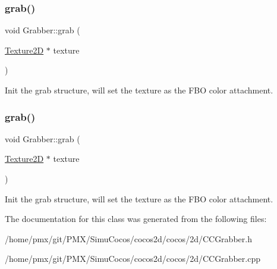 \subsubsection{\texorpdfstring{grab()}{grab()}\hspace{0.1cm}{\footnotesize\ttfamily [1/2]}}
{\footnotesize\ttfamily void Grabber\+::grab (\begin{DoxyParamCaption}\item[{\hyperlink{classTexture2D}{Texture2D} $\ast$}]{texture }\end{DoxyParamCaption})}

Init the grab structure, will set the texture as the F\+BO color attachment. \mbox{\label{classGrabber_abca4258ce3080009f5ed06d30ea913f7}} 
\subsubsection{\texorpdfstring{grab()}{grab()}\hspace{0.1cm}{\footnotesize\ttfamily [2/2]}}
{\footnotesize\ttfamily void Grabber\+::grab (\begin{DoxyParamCaption}\item[{\hyperlink{classTexture2D}{Texture2D} $\ast$}]{texture }\end{DoxyParamCaption})}

Init the grab structure, will set the texture as the F\+BO color attachment. 

The documentation for this class was generated from the following files\+:\begin{DoxyCompactItemize}
\item 
/home/pmx/git/\+P\+M\+X/\+Simu\+Cocos/cocos2d/cocos/2d/C\+C\+Grabber.\+h\item 
/home/pmx/git/\+P\+M\+X/\+Simu\+Cocos/cocos2d/cocos/2d/C\+C\+Grabber.\+cpp\end{DoxyCompactItemize}
